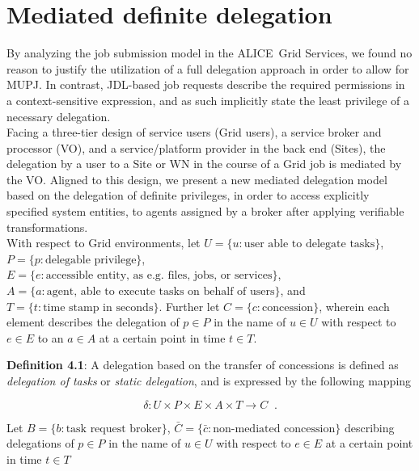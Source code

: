 \documentclass[10pt]{iopart}
\newcommand{\alice}{ALICE}
\begin{document}
\section{Mediated definite delegation}
\label{model}
By analyzing the job submission model in the \alice\ Grid Services, we found no
reason to justify the utilization of a full delegation approach in
order to allow for MUPJ. In contrast, JDL-based job requests
describe the required permissions in a context-sensitive
expression, and as such implicitly state the least privilege of a necessary
delegation.\\
Facing a three-tier design of service users (Grid users), a service
broker and processor (VO), and a service/platform provider in the back end (Sites), 
the delegation by a user to a Site or WN in the course of a Grid job is mediated
by the VO. Aligned to this design, we present a new mediated delegation
model based on the delegation of definite privileges, in order to access explicitly
specified system entities, to agents assigned by a broker after applying
verifiable transformations.\\
With respect to Grid environments, let
$U = \{ u: \textrm{user able to delegate tasks}\}$,
$P = \{ p: \textrm{delegable privilege}\}$,
$E = \{ e: \textrm{accessible entity, as e.g. files, jobs, or
services}\}$, $A = \{ a: \textrm{agent, able to execute tasks
on behalf of users}\}$, and $T = \{ t: \textrm{time stamp in seconds} \}$.
Further let $C = \{ c: \textrm{concession}\}$, wherein each element describes
the delegation of $p \in P$ in the name of $u \in U$ with respect to $e \in E$ to an $a \in A$ 
at a certain point in time $t \in T$.\\
\par
\begingroup
\leftskip=0.4cm \noindent
\textbf{Definition 4.1}: A
delegation based on the transfer of concessions is defined as \textit{delegation of tasks}
or \textit{static delegation}, and is expressed by the following mapping
\par
\endgroup\noindent
\begin{center}
\begin{equation}\tag{f 4.1}\label{e4.1}\delta: U\times P \times E \times A
\times T \rightarrow C \;\;.\end{equation}
\end{center}
Let $B = \{ b: \textrm{task request broker}\}$, $ \bar{C} =
\{ \bar{c}: \textrm{non-mediated concession} \}$ describing delegations of $p \in P$ in
the name of $u \in U$ with respect to $e \in E$ at a certain point in time $t \in T$
\end{document}
